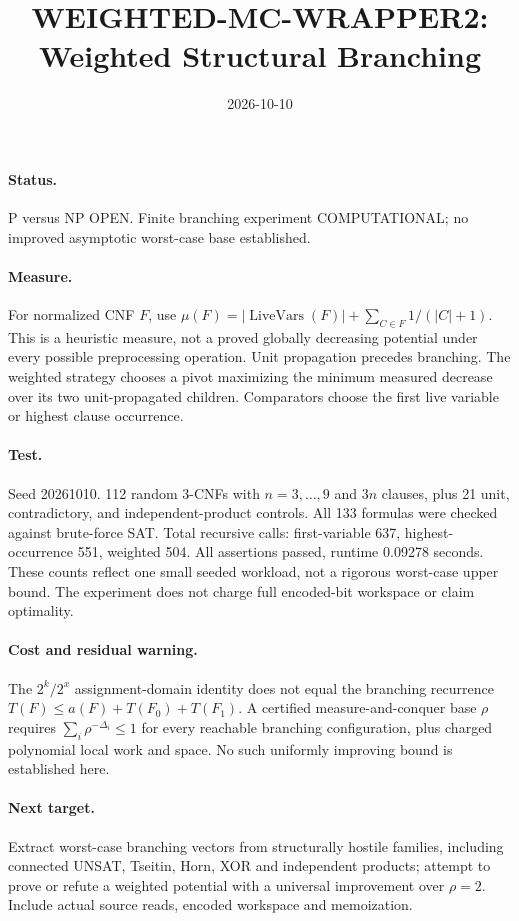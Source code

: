 \documentclass{article}
\begin{document}
\title{WEIGHTED-MC-WRAPPER2: Weighted Structural Branching}
\date{2026-10-10}\maketitle
\paragraph{Status.} P versus NP OPEN. Finite branching experiment COMPUTATIONAL; no improved asymptotic worst-case base established.
\paragraph{Measure.} For normalized CNF $F$, use $\mu(F)=|\operatorname{LiveVars}(F)|+\sum_{C\in F}1/(|C|+1)$. This is a heuristic measure, not a proved globally decreasing potential under every possible preprocessing operation. Unit propagation precedes branching. The weighted strategy chooses a pivot maximizing the minimum measured decrease over its two unit-propagated children. Comparators choose the first live variable or highest clause occurrence.
\paragraph{Test.} Seed 20261010. 112 random 3-CNFs with $n=3,\ldots,9$ and $3n$ clauses, plus 21 unit, contradictory, and independent-product controls. All 133 formulas were checked against brute-force SAT. Total recursive calls: first-variable 637, highest-occurrence 551, weighted 504. All assertions passed, runtime 0.09278 seconds. These counts reflect one small seeded workload, not a rigorous worst-case upper bound. The experiment does not charge full encoded-bit workspace or claim optimality.
\paragraph{Cost and residual warning.} The $2^k/2^x$ assignment-domain identity does not equal the branching recurrence $T(F)\le a(F)+T(F_0)+T(F_1)$. A certified measure-and-conquer base $\rho$ requires $\sum_i\rho^{-\Delta_i}\le1$ for every reachable branching configuration, plus charged polynomial local work and space. No such uniformly improving bound is established here.
\paragraph{Next target.} Extract worst-case branching vectors from structurally hostile families, including connected UNSAT, Tseitin, Horn, XOR and independent products; attempt to prove or refute a weighted potential with a universal improvement over $\rho=2$. Include actual source reads, encoded workspace and memoization.
\end{document}
